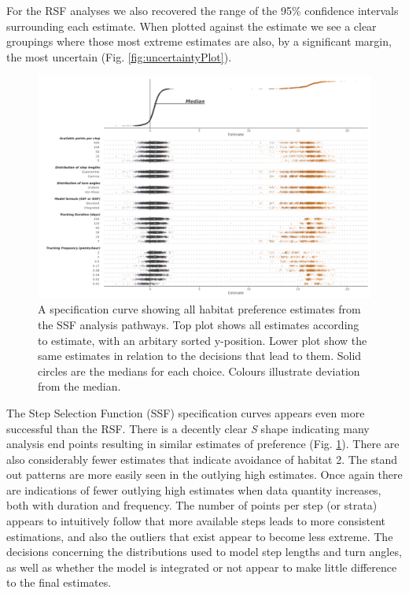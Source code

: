 \documentclass[10pt,a4paper]{article}
\begin{document}
For the RSF analyses we also recovered the range of the 95\% confidence intervals surrounding each estimate.
When plotted against the estimate we see a clear groupings where those most extreme estimates are also, by a significant margin, the most uncertain (Fig. \ref{fig:uncertaintyPlot}).

\begin{figure}
\includegraphics[width=1\linewidth]{../figures/ssfSpecCurve} \caption{A specification curve showing all habitat preference estimates from the SSF analysis pathways. Top plot shows all estimates according to estimate, with an arbitary sorted y-position. Lower plot show the same estimates in relation to the decisions that lead to them. Solid circles are the medians for each choice. Colours illustrate deviation from the median.}\label{fig:specCurveSSF}
\end{figure}

The Step Selection Function (SSF) specification curves appears even more successful than the RSF.
There is a decently clear \emph{S} shape indicating many analysis end points resulting in similar estimates of preference (Fig. \ref{fig:specCurveSSF}).
There are also considerably fewer estimates that indicate avoidance of habitat 2.
The stand out patterns are more easily seen in the outlying high estimates.
Once again there are indications of fewer outlying high estimates when data quantity increases, both with duration and frequency.
The number of points per step (or strata) appears to intuitively follow that more available steps leads to more consistent estimations, and also the outliers that exist appear to become less extreme.
The decisions concerning the distributions used to model step lengths and turn angles, as well as whether the model is integrated or not appear to make little difference to the final estimates.
\end{document}
